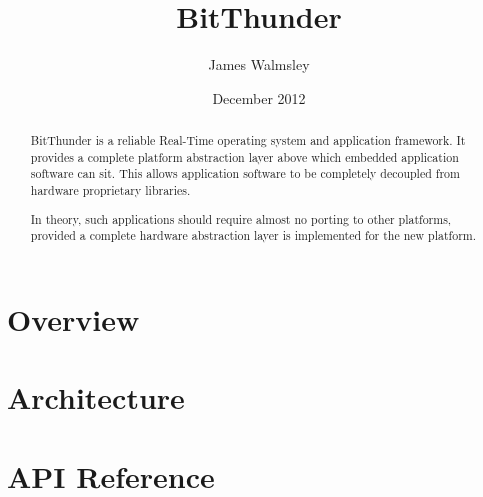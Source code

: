 \documentclass[10pt,a4paper,final]{article}
\begin{document}
\title{\huge{BitThunder}}
\author{James Walmsley}
\date{December 2012}
\maketitle

\begin {abstract}
BitThunder is a reliable Real-Time operating system and application framework. It provides
a complete platform abstraction layer above which embedded application software can sit. This allows
application software to be completely decoupled from hardware proprietary libraries.

In theory, such applications should require almost no porting to other platforms, provided
a complete hardware abstraction layer is implemented for the new platform.
\end {abstract}

\newpage
\tableofcontents
\newpage

\part{Overview}


\newpage
\part{Architecture}


\newpage
\part{API Reference}

\end{document}
